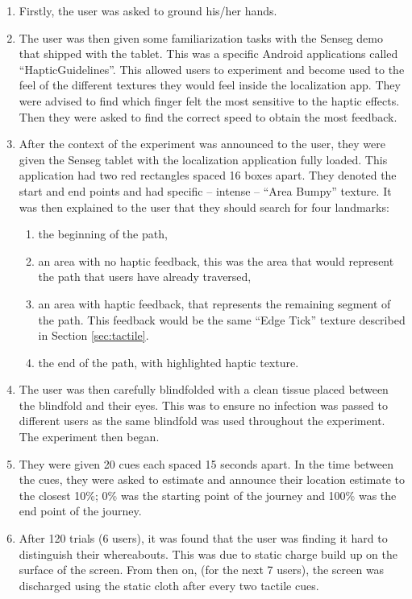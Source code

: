 \begin{enumerate}

\item Firstly, the user was asked to ground his/her hands. 

\item The user was then given some familiarization tasks with the Senseg demo that shipped with the tablet. This was a specific Android applications called 
``HapticGuidelines''. This allowed users to experiment and become used to the feel of the different textures they would feel inside the localization app. They were advised to find which finger felt the most sensitive to the haptic effects. Then they were asked to find the correct speed to obtain the most feedback. 

\item After the context of the experiment was announced to the user, they were given the Senseg tablet with the localization application fully loaded. This application had two red rectangles spaced 16 boxes apart. They denoted the start and end points and had specific -- intense -- ``Area Bumpy'' texture. It was then explained to the user that they should search for four landmarks:  

\begin{enumerate}
\item the beginning of the path,
\item an area with no haptic feedback, this was the area that would represent the path that users have already traversed,
\item an area with haptic feedback, that represents the remaining segment of the path. This feedback would be the same ``Edge Tick'' texture described in Section \ref{sec:tactile}.
\item the end of the path, with highlighted haptic texture.
\end{enumerate}


\item The user was then carefully blindfolded with a clean tissue placed between the blindfold and their eyes. This was to ensure no infection was passed to different users as the same blindfold was used throughout the experiment. The experiment then began.

\item They were given 20 cues each spaced 15 seconds apart. In the time between the cues, they were asked to estimate and announce their location estimate to the closest 10\%; 0\% was the starting point of the journey and 100\% was the end point of the journey.


\item After 120 trials (6 users), it was found that the user was finding it hard to distinguish their whereabouts. This was due to static charge build up on the surface of the screen. From then on, (for the next 7 users), the screen was discharged using the static cloth after every two tactile cues.

\end{enumerate}
